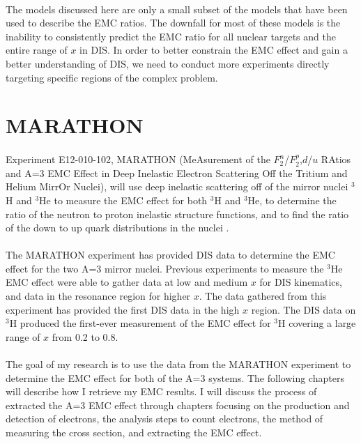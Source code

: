 \paragraph{} The models discussed here are only a small subset of the models that have been used to describe the EMC ratios. The downfall for most of these models is the inability to consistently predict the EMC ratio for all nuclear targets and the entire range of $x$ in DIS. In order to better constrain the EMC effect and gain a better understanding of DIS, we need to conduct more experiments directly targeting specific regions of the complex problem.  

\section{MARATHON}
\paragraph{}Experiment E12-010-102, MARATHON (MeAsurement of the $F_2^n$/$F_2^p$,$d$/$u$ RAtios and A=3 EMC Effect in Deep Inelastic Electron Scattering Off the Tritium and Helium MirrOr Nuclei), will use deep inelastic scattering off of the mirror nuclei $^3$H and $^3$He to measure the EMC effect for both $^3$H and $^3$He, to determine the ratio of the neutron to proton inelastic structure functions, and to find the ratio of the down to up quark distributions in the nuclei \cite{Marathon}. 
\paragraph{}The MARATHON experiment has provided DIS data to determine the EMC effect for the two A=3 mirror nuclei. Previous experiments to measure the $^3$He EMC effect were able to gather data at low and medium $x$ for DIS kinematics, and data in the resonance region for higher $x$. The data gathered from this experiment has provided the first DIS data in the high $x$ region. The DIS data on $^3$H produced the first-ever measurement of the EMC effect for $^3$H covering a large range of $x$ from 0.2 to 0.8.
\paragraph{}The goal of my research is to use the data from the MARATHON experiment to determine the EMC effect for both of the A=3 systems. The following chapters will describe how I retrieve my EMC results. I will discuss the process of extracted the A=3 EMC effect through chapters focusing on the production and detection of electrons, the analysis steps to count electrons, the method of measuring the cross section, and extracting the EMC effect.  



